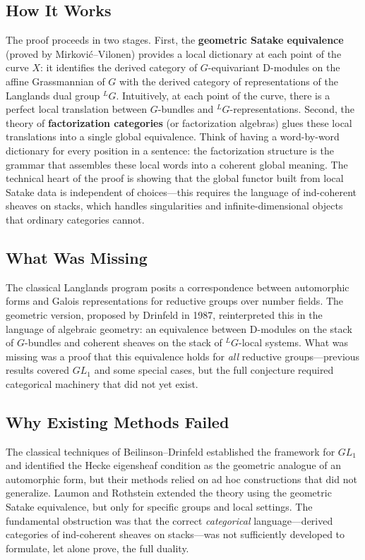 \subsection{How It Works}
The proof proceeds in two stages. First, the \textbf{geometric Satake equivalence} (proved by Mirkovi\'c--Vilonen) provides a local dictionary at each point of the curve $X$: it identifies the derived category of $G$-equivariant D-modules on the affine Grassmannian of $G$ with the derived category of representations of the Langlands dual group ${}^L\!G$. Intuitively, at each point of the curve, there is a perfect local translation between $G$-bundles and ${}^L\!G$-representations. Second, the theory of \textbf{factorization categories} (or factorization algebras) glues these local translations into a single global equivalence. Think of having a word-by-word dictionary for every position in a sentence: the factorization structure is the grammar that assembles these local words into a coherent global meaning. The technical heart of the proof is showing that the global functor built from local Satake data is independent of choices---this requires the language of ind-coherent sheaves on stacks, which handles singularities and infinite-dimensional objects that ordinary categories cannot.

\subsection{What Was Missing}
The classical Langlands program posits a correspondence between automorphic forms and Galois representations for reductive groups over number fields. The geometric version, proposed by Drinfeld in 1987, reinterpreted this in the language of algebraic geometry: an equivalence between D-modules on the stack of $G$-bundles and coherent sheaves on the stack of ${}^L\!G$-local systems. What was missing was a proof that this equivalence holds for \emph{all} reductive groups---previous results covered $GL_1$ and some special cases, but the full conjecture required categorical machinery that did not yet exist.

\subsection{Why Existing Methods Failed}
The classical techniques of Beilinson--Drinfeld established the framework for $GL_1$ and identified the Hecke eigensheaf condition as the geometric analogue of an automorphic form, but their methods relied on ad hoc constructions that did not generalize. Laumon and Rothstein extended the theory using the geometric Satake equivalence, but only for specific groups and local settings. The fundamental obstruction was that the correct \emph{categorical} language---derived categories of ind-coherent sheaves on stacks---was not sufficiently developed to formulate, let alone prove, the full duality.

